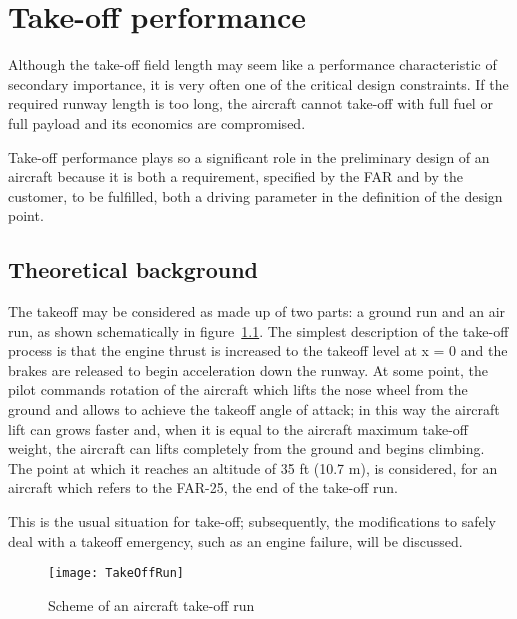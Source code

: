 \chapter{Take-off performance}
Although the take-off field length may seem like a performance characteristic of secondary importance, it is very often one of the critical design constraints. If the required runway length is too long, the aircraft cannot take-off with full fuel or full payload and its economics are compromised.

Take-off performance plays so a significant role in the preliminary design of an aircraft because it is both a requirement, specified by the FAR and by the customer, to be fulfilled, both a driving parameter in the definition of the design point. 

\section{Theoretical background}
The takeoff may be considered as made up of two parts: a ground run and an air run, as shown schematically in figure~\ref{fig:TOrun}. The simplest description of the take-off process is that the engine thrust is increased to the takeoff level at x = 0 and the brakes are released to begin acceleration down the runway. At some point, the pilot commands rotation of the aircraft which lifts the nose wheel from the ground and allows to achieve the takeoff angle of attack; in this way the aircraft lift can grows faster and, when it is equal to the aircraft maximum take-off weight, the aircraft can lifts completely from the ground and begins climbing. The point at which it reaches an altitude of 35 \si{ft} (10.7 \si{\meter}), is considered, for an aircraft which refers to the FAR-25, the end of the take-off run. 

This is the usual situation for take-off; subsequently, the modifications to safely deal with a takeoff emergency, such as an engine failure, will be discussed.

\begin{figure}[!t]
\centering
\texttt{[image: TakeOffRun]}
\caption{Scheme of an aircraft take-off run}
\label{fig:TOrun}
\end{figure}

